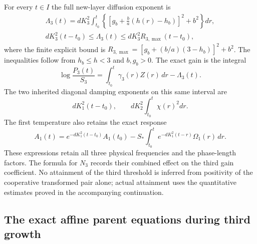For every $t\in I$ the full new-layer diffusion exponent is
\begin{equation}\label{tg:diffusion}
\begin{gathered}
 \Lambda_3(t)=dK_3^2\int_{t_0}^t
       \left\{\left[g_b+\frac ba(h(r)-h_b)\right]^2+b^2\right\}dr,\\
 dK_3^2(t-t_0)\leq\Lambda_3(t)
        \leq dK_3^2R_{3,\max}(t-t_0),
\end{gathered}
\end{equation}
where the finite explicit bound is
$R_{3,\max}=[g_b+(b/a)(3-h_b)]^2+b^2$.
The inequalities follow from $h_b\leq h<3$ and $b,g_b>0$.
The exact gain is the integral
\[
 \log\frac{P_3(t)}{S_3}
    =\int_{t_0}^t\gamma_3(r)Z(r)\,dr-\Lambda_3(t).
\]
The two inherited diagonal damping exponents on this same interval are
\[
 dK_1^2(t-t_0),\qquad dK_2^2\int_{t_0}^t\chi(r)^2dr.
\]
The first temperature also retains the exact response
\[
 A_1(t)=e^{-dK_1^2(t-t_0)}A_1(t_0)
       -S_*\int_{t_0}^t e^{-dK_1^2(t-r)}\Omega_1(r)\,dr.
\]
These expressions retain all three physical frequencies and the
phase-length factors. The formula for $N_3$ records their combined
effect on the third gain coefficient. No attainment of the third
threshold is inferred from positivity of the cooperative transformed
pair alone; actual attainment uses the quantitative estimates proved
in the accompanying continuation.

\subsection{The exact affine parent equations during third growth}

